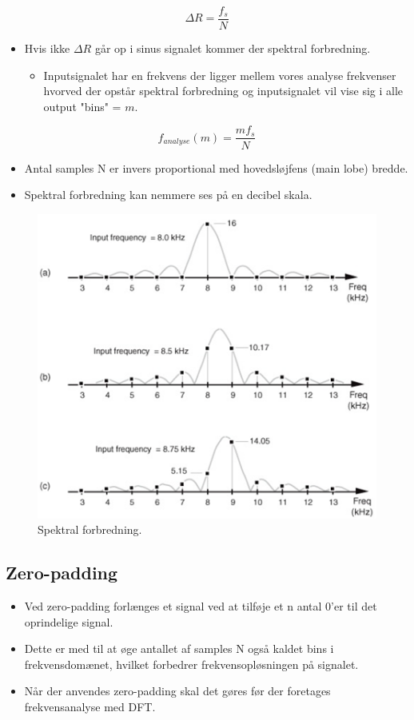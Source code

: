 \documentclass[danish]{article}
\begin{document}
\begin{equation}
\Delta R=\frac{f_s}{N}
\end{equation}

\begin{itemize}
	\item Hvis ikke $\Delta R$ går op i sinus signalet kommer der spektral forbredning. 
	\begin{itemize}
		\item Inputsignalet har en frekvens der ligger mellem vores analyse frekvenser hvorved der opstår spektral forbredning og inputsignalet vil vise sig i alle output "bins" = $m$.
	\end{itemize}
\end{itemize}

\begin{equation}
f_{analyse}(m)=\frac{m f_s}{N}
\end{equation}

\begin{itemize}
	\item Antal samples N er invers proportional med hovedsløjfens (main lobe) bredde.
	\item Spektral forbredning kan nemmere ses på en decibel skala.
\end{itemize}

\begin{figure}[H]
	\centering
	\includegraphics[width=0.6\linewidth]{graphics/leakage}
	\caption{Spektral forbredning.}
	\label{fig:leakage}
\end{figure}

\subsection{Zero-padding}
\begin{itemize}
	\item Ved zero-padding forlænges et signal ved at tilføje et n antal 0'er til det oprindelige signal. 
	\item Dette er med til at øge antallet af samples N også kaldet bins i frekvensdomænet, hvilket forbedrer frekvensopløsningen på signalet.
	\item Når der anvendes zero-padding skal det gøres før der foretages frekvensanalyse med DFT.
\end{itemize}
\end{document}
